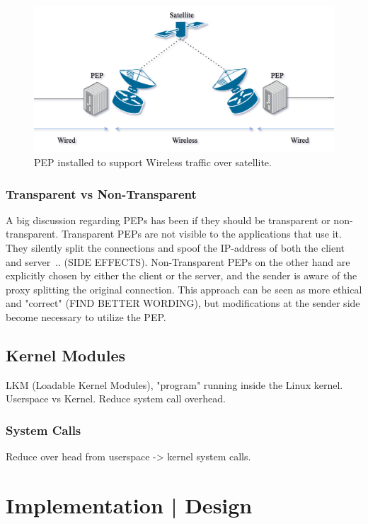 \documentclass[a4paper,english, 11pt]{report}
\begin{document}
\begin{figure}[h] %
	\centering
	\includegraphics[scale=0.50]{../diagrams/drawio/pep_satellite.png}
  	\caption{PEP installed to support Wireless traffic over satellite.}
  	\label{fig:blockage}
\end{figure}

\subsection{Transparent vs Non-Transparent}
A big discussion regarding PEPs has been if they should be transparent or non-transparent. Transparent PEPs are not visible to the applications that use it. They silently split the connections and spoof the IP-address of both the client and server~\cite{pep_dna}.. (SIDE EFFECTS). Non-Transparent PEPs on the other hand are explicitly chosen by either the client or the server, and the sender is aware of the proxy splitting the original connection. This approach can be seen as more ethical and "correct" (FIND BETTER WORDING), but modifications at the sender side become necessary to utilize the PEP.

\section{Kernel Modules}
LKM (Loadable Kernel Modules), "program" running inside the Linux kernel.
Userspace vs Kernel. Reduce system call overhead.
\subsection{System Calls}
Reduce over head from userspace -> kernel system calls.

\chapter{Implementation | Design}
\end{document}
